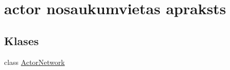 \hypertarget{namespaceactor}{}\section{actor nosaukumvietas apraksts}
\label{namespaceactor}
\subsection*{Klases}
\begin{DoxyCompactItemize}
\item 
class \hyperlink{classactor_1_1_actor_network}{Actor\+Network}
\end{DoxyCompactItemize}
